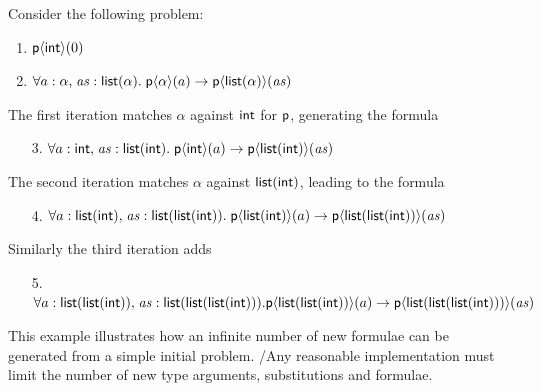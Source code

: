 \documentclass[runningheads]{llncs}
\begin{document}
\begin{examplex}\rm
Consider the following problem:
\begin{enumerate}
   \item \(\textsf{p}\langle \textsf{int}\rangle(0)\)
   \item \(\forall a: \alpha{,}\; \mathit{as}:\textsf{list}(\alpha){.}\; \textsf{p}\langle\alpha\rangle(a) \rightarrow \textsf{p}\langle \textsf{list}(\alpha)\rangle(\mathit{as})\)
\end{enumerate}
%
The first iteration matches \(\alpha\) against \(\textsf{int}\) for $\textsf{p}$, generating the formula
%
\begin{enumerate}
   \item[3.] \(\forall a: \textsf{int}{,}\; \mathit{as}:\textsf{list}(\textsf{int}){.}\; \textsf{p}\langle\textsf{int}\rangle(a) \rightarrow \textsf{p}\langle \textsf{list}(\textsf{int})\rangle(\mathit{as})\)
\end{enumerate}
%
The second iteration matches \(\alpha\) against \(\textsf{list}(\textsf{int})\), leading to the formula
%
\begin{enumerate}
   \item[4.] \(\forall a: \textsf{list}(\textsf{int}){,}\; \mathit{as}:\textsf{list}(\textsf{list}(\textsf{int})){.}\; \textsf{p}\langle\textsf{list}(\textsf{int})\rangle(a) \rightarrow \textsf{p}\langle \textsf{list}(\textsf{list}(\textsf{int}))\rangle(\mathit{as})\)
\end{enumerate}
%
Similarly the third iteration adds
%
\begin{enumerate}
   \item[5.] 
         \( \forall a: \textsf{list}(\textsf{list}(\textsf{int})){,}\; \mathit{as}:\textsf{list}(\textsf{list}(\textsf{list}(\textsf{int}))){.} \\ \textsf{p}\langle\textsf{list}(\textsf{list}(\textsf{int}))\rangle(a) \rightarrow \textsf{p}\langle \textsf{list}(\textsf{list}(\textsf{list}(\textsf{int})))\rangle(\mathit{as})\)
\end{enumerate}

\end{examplex}

This example illustrates how an infinite number of new formulae can be generated from a simple initial problem.
/Any reasonable implementation must limit the number of new type arguments, substitutions and formulae.
\end{document}
